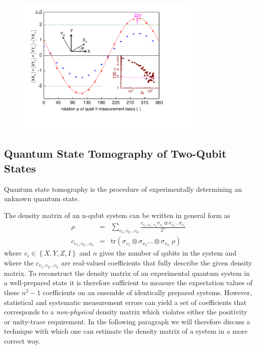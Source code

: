 \begin{figure}
	\centering
		\includegraphics[width=0.8\textwidth]{./material/papers/iswap/figures/chsh}
	\label{fig:CHSH}
	\caption{}
\end{figure}


\subsection{Quantum State Tomography of Two-Qubit States}

Quantum state tomography is the procedure of experimentally determining an unknown quantum state\citep{michael_a._nielsen_quantum_2000}.

The density matrix of an n-qubit system can be written in general form as
\begin{eqnarray}
\rho & = & \sum\limits_{v_1,v_2\hdots v_n} \frac{c_{v_1,v_2\hdots v_n} \sigma_{v_1}\otimes \sigma_{v_2}\hdots \sigma_{v_n}}{2^n} \label{eq:state_tomography_state_representation} \\
c_{v_1,v_2\hdots v_n} & = & \mathrm{tr}\left(\sigma_{v_1}\otimes \sigma_{v_2}\hdots \otimes\sigma_{v_n} \; \rho \right)  \label{eq:state_tomography_coefficients}
\end{eqnarray}
where $v_i \in \left\{ X,Y,Z,I\right\}$ and $n$ gives the number of qubits in the system and where the $c_{v_1,v_2\hdots v_n}$ are real-valued coefficients that fully describe the given density matrix. To reconstruct the density matrix of an experimental quantum system in a well-prepared state it is therefore sufficient to measure the expectation values of these $n^2-1$ coefficients on an ensemble of identically prepared systems. However, statistical and systematic measurement errors can yield a set of coefficients that corresponds to a {\it non-physical} density matrix which violates either the positivity or unity-trace requirement. In the following paragraph we will therefore discuss a technique with which one can estimate the density matrix of a system in a more correct way.

